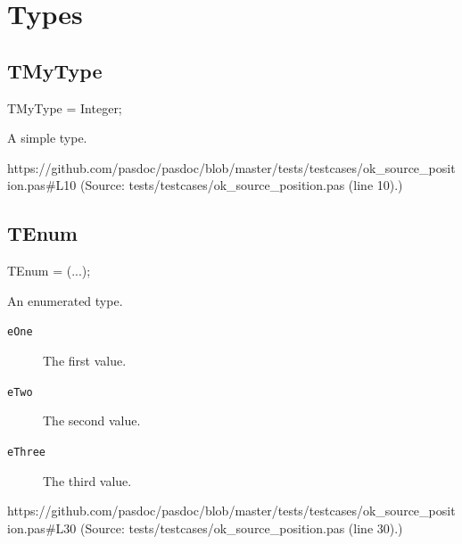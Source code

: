\documentclass{report}
\begin{document}
\section{Types}
\subsection*{TMyType}
\begin{list}{}{
\setlength{\itemindent}{0cm}
\setlength{\listparindent}{0cm}
\setlength{\leftmargin}{\evensidemargin}
\addtolength{\leftmargin}{\tmplength}
\settowidth{\labelsep}{X}
\addtolength{\leftmargin}{\labelsep}
\setlength{\labelwidth}{\tmplength}
}
\begin{flushleft}
\item[\textbf{Declaration}\hfill]
\begin{ttfamily}
TMyType = Integer;\end{ttfamily}


\end{flushleft}
\par
\item[\textbf{Description}]
A simple type.\par
https://github.com/pasdoc/pasdoc/blob/master/tests/testcases/ok{\_}source{\_}position.pas{\#}L10 (Source: tests/testcases/ok{\_}source{\_}position.pas (line 10).)

\end{list}
\subsection*{TEnum}
\begin{list}{}{
\setlength{\itemindent}{0cm}
\setlength{\listparindent}{0cm}
\setlength{\leftmargin}{\evensidemargin}
\addtolength{\leftmargin}{\tmplength}
\settowidth{\labelsep}{X}
\addtolength{\leftmargin}{\labelsep}
\setlength{\labelwidth}{\tmplength}
}
\begin{flushleft}
\item[\textbf{Declaration}\hfill]
\begin{ttfamily}
TEnum = (...);\end{ttfamily}


\end{flushleft}
\par
\item[\textbf{Description}]
An enumerated type.\item[\textbf{Values}]
\begin{description}
\item[\texttt{eOne}] The first value.
\item[\texttt{eTwo}] The second value.
\item[\texttt{eThree}] The third value.
\end{description}
\par
https://github.com/pasdoc/pasdoc/blob/master/tests/testcases/ok{\_}source{\_}position.pas{\#}L30 (Source: tests/testcases/ok{\_}source{\_}position.pas (line 30).)

\end{list}
\end{document}
